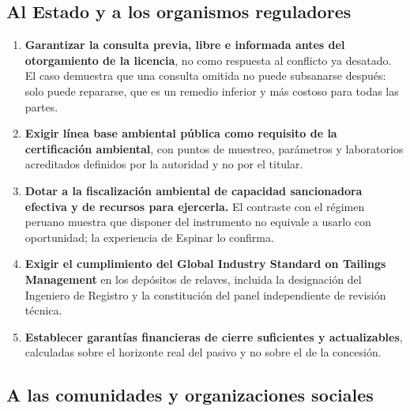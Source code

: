 \subsection{Al Estado y a los organismos reguladores}

\begin{enumerate}
  \item \textbf{Garantizar la consulta previa, libre e informada antes del
        otorgamiento de la licencia}, no como respuesta al conflicto ya
        desatado. El caso demuestra que una consulta omitida no puede subsanarse
        después: solo puede repararse, que es un remedio inferior y más costoso
        para todas las partes.
  \item \textbf{Exigir línea base ambiental pública como requisito de la
        certificación ambiental}, con puntos de muestreo, parámetros y
        laboratorios acreditados definidos por la autoridad y no por el titular.
  \item \textbf{Dotar a la fiscalización ambiental de capacidad sancionadora
        efectiva y de recursos para ejercerla.} El contraste con el régimen
        peruano muestra que disponer del instrumento no equivale a usarlo con
        oportunidad; la experiencia de Espinar lo confirma.
  \item \textbf{Exigir el cumplimiento del Global Industry Standard on Tailings
        Management} en los depósitos de relaves, incluida la designación del
        Ingeniero de Registro y la constitución del panel independiente de
        revisión técnica.
  \item \textbf{Establecer garantías financieras de cierre suficientes y
        actualizables}, calculadas sobre el horizonte real del pasivo y no sobre
        el de la concesión.
\end{enumerate}

\subsection{A las comunidades y organizaciones sociales}

